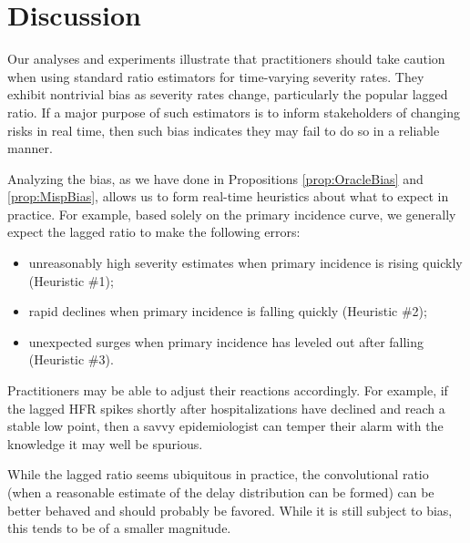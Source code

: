 \documentclass{article}
\renewcommand{\hat}{\widehat} %
\begin{document}

\section{Discussion}

Our analyses and experiments illustrate that practitioners should take caution
when using standard ratio estimators for time-varying severity rates. They
exhibit nontrivial bias as severity rates change, particularly the popular
lagged ratio. If a major purpose of such estimators is to inform stakeholders of
changing risks in real time, then such bias indicates they may fail to do so in
a reliable manner.

Analyzing the bias, as we have done in Propositions \ref{prop:OracleBias} and 
\ref{prop:MispBias}, allows us to form real-time heuristics about what to
expect in practice. For example, based solely on the primary incidence curve, we
generally expect the lagged ratio to make the following errors: 
\begin{itemize}
\item unreasonably high severity estimates when primary incidence is rising
  quickly (Heuristic \#1); 
\item rapid declines when primary incidence is falling quickly (Heuristic \#2); 
\item unexpected surges when primary incidence has leveled out after falling (Heuristic \#3).  
\end{itemize}
Practitioners may be able to adjust their reactions accordingly. For example, if 
the lagged HFR spikes shortly after hospitalizations have declined and reach a
stable low point, then a savvy epidemiologist can temper their alarm with the
knowledge it may well be spurious.  

While the lagged ratio seems ubiquitous in practice, the convolutional ratio
(when  a reasonable estimate of the delay distribution can be formed) can be
better behaved and should probably be favored. While it is still subject to
bias, this tends to be of a smaller magnitude. 
\end{document}
